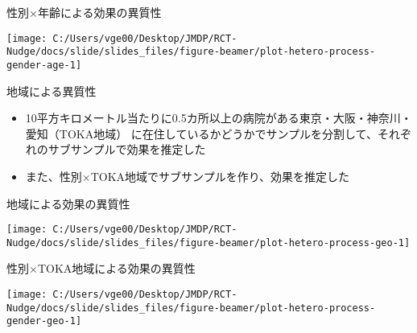 \documentclass[
      aspectratio=169,
        12pt,
    ]{beamer}
\providecommand{\tightlist}{%
  \setlength{\itemsep}{0pt}\setlength{\parskip}{0pt}}
\begin{document}
\begin{frame}{性別×年齢による効果の異質性}
\protect\hypertarget{ux6027ux5225ux5e74ux9f62ux306bux3088ux308bux52b9ux679cux306eux7570ux8ceaux6027-2}{}
\begin{center}\texttt{[image: C:/Users/vge00/Desktop/JMDP/RCT-Nudge/docs/slide/slides\_files/figure-beamer/plot-hetero-process-gender-age-1]} \end{center}
\end{frame}

\begin{frame}{地域による異質性}
\protect\hypertarget{ux5730ux57dfux306bux3088ux308bux7570ux8ceaux6027-1}{}
\begin{itemize}
\tightlist
\item
  10平方キロメートル当たりに0.5カ所以上の病院がある東京・大阪・神奈川・愛知（TOKA地域）
  に在住しているかどうかでサンプルを分割して、それぞれのサブサンプルで効果を推定した
\item
  また、性別×TOKA地域でサブサンプルを作り、効果を推定した
\end{itemize}
\end{frame}

\begin{frame}{地域による効果の異質性}
\protect\hypertarget{ux5730ux57dfux306bux3088ux308bux52b9ux679cux306eux7570ux8ceaux6027}{}
\begin{center}\texttt{[image: C:/Users/vge00/Desktop/JMDP/RCT-Nudge/docs/slide/slides\_files/figure-beamer/plot-hetero-process-geo-1]} \end{center}
\end{frame}

\begin{frame}{性別×TOKA地域による効果の異質性}
\protect\hypertarget{ux6027ux5225tokaux5730ux57dfux306bux3088ux308bux52b9ux679cux306eux7570ux8ceaux6027}{}
\begin{center}\texttt{[image: C:/Users/vge00/Desktop/JMDP/RCT-Nudge/docs/slide/slides\_files/figure-beamer/plot-hetero-process-gender-geo-1]} \end{center}
\end{frame}
\end{document}
